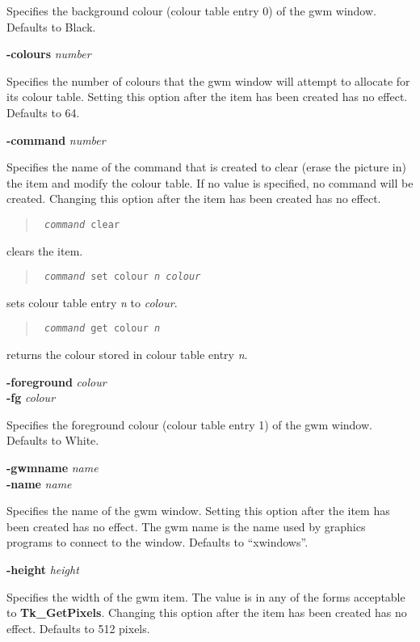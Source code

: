 \begin{rquote}
Specifies the background colour (colour table entry 0) of the gwm window.
Defaults to Black.
\end{rquote}

{\bf -colours} {\em number}
\begin{rquote}
Specifies the number of colours that the gwm window will attempt to allocate
for its colour table. Setting this option after the item has been created
has no effect. Defaults to 64.
\end{rquote}

{\bf -command} {\em number}
\begin{rquote}
Specifies the name of the command that is created to clear (erase the picture
in) the item and modify the colour table. If no value is specified, no
command will be created. Changing this option after the item has been created
has no effect.
\begin{quote}{\tt
{\em command} clear
}\end{quote}
clears the item.
\begin{quote}{\tt
{\em command} set colour {\em n} {\em colour}
}\end{quote}
sets colour table entry {\em n} to {\em colour}.
\begin{quote}{\tt
{\em command} get colour {\em n}
}\end{quote}
returns the colour stored in colour table entry {\em n}.
\end{rquote}

{\bf -foreground} {\em colour}\\
{\bf -fg} {\em colour}
\begin{rquote}
Specifies the foreground colour (colour table entry 1) of the gwm window.
Defaults to White.
\end{rquote}

{\bf -gwmname} {\em name}\\
{\bf -name} {\em name}
\begin{rquote}
Specifies the name of the gwm window. Setting
this option after the item has been created has no effect. The gwm name
is the name used by graphics programs to connect to the window. Defaults
to ``xwindows''.
\end{rquote}

{\bf -height} {\em height}
\begin{rquote}
Specifies the width of the gwm item. The value is in any of the forms
acceptable to {\bf Tk\_GetPixels}. Changing this option after the item
has been created has no effect. Defaults to 512 pixels.
\end{rquote}

